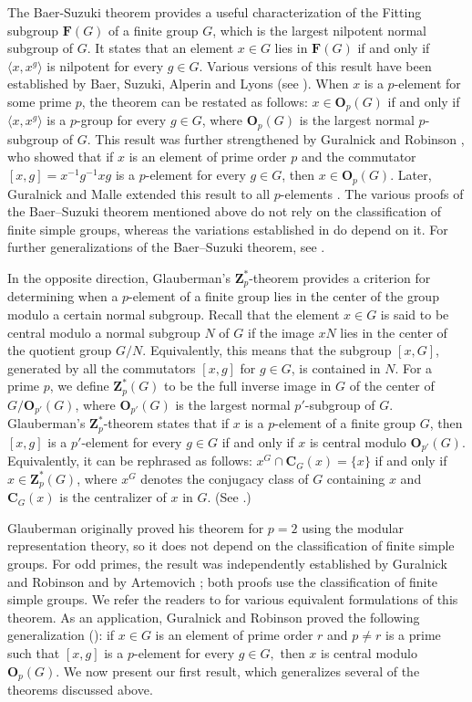 \documentclass[twoside,a4paper,reqno,12pt]{amsart}
\newcommand{\<}{\langle}
\renewcommand{\>}{\rangle}
\newcommand{\la}{\langle}
\newcommand{\ra}{\rangle}
\newcommand{\OB}{\mathbf{O}}
\newcommand{\CB}{\mathbf{C}}
\newcommand{\FB}{\mathbf{F}}
\newcommand{\ZB}{\mathbf{Z}}
\renewcommand{\:}{\colon}
\theoremstyle{definition}
\begin{document}
The Baer-Suzuki theorem provides a useful characterization of the Fitting subgroup $\FB(G)$ of a finite group $G$, which is the largest nilpotent normal subgroup of $G$. It states that an element $x\in G$ lies in $\FB(G)$ if and only if $\la x,x^g\ra$ is nilpotent for every $g\in G.$ Various versions of this result  have been established by Baer, Suzuki, Alperin and Lyons (see \cite{Baer,Suzuki,AL}).
When $x$ is a $p$-element for some prime $p$, the theorem can be restated as follows: $x\in \OB_p(G)$ if and only if $\la x,x^g\ra$ is a $p$-group for every $g\in G$, where $\OB_p(G)$ is the largest normal $p$-subgroup of $G$.  This result was further strengthened by Guralnick and Robinson \cite[Theorem A]{GR}, who showed that if $x$ is an element of prime order $p$ and the commutator $[x,g]=x^{-1}g^{-1}xg$ is a $p$-element for every $g\in G$, then $x\in \OB_p(G)$. Later, Guralnick and Malle extended this result to  all $p$-elements  \cite[Theorem 1.4]{GM1}.  The various proofs of the Baer–Suzuki theorem mentioned above do not rely on the classification of finite simple groups, whereas the variations established in \cite{GR,GM1} do depend on it. For further generalizations of the Baer–Suzuki theorem, see \cite{GTT,Wielandt}.


In the opposite direction, Glauberman's $\ZB_p^*$-theorem provides a criterion for determining when a $p$-element of a finite group lies in the center of the group modulo a certain normal subgroup. Recall that the element $x\in G$ is said to be central modulo a normal subgroup $N$ of $G$ if the image $xN$ lies in the center of the quotient group $G/N$. Equivalently, this means that  the subgroup $[x,G]$, generated by all the commutators $[x,g] $ for $g\in G$, is contained in $N$. For a prime  $p$, we define $\ZB_p^*(G)$ to be the full inverse image in $G$ of the center of $G/\OB_{p'}(G)$, where $\OB_{p'}(G)$ is the largest normal $p'$-subgroup of $G$. Glauberman's $\ZB_p^*$-theorem states that if $x$ is a $p$-element of a finite group $G$, then $[x,g]$ is a $p'$-element for every $g\in G$ if and only if $x$ is central modulo $\OB_{p'}(G)$.  Equivalently, it can be rephrased as follows:  $x^G\cap \CB_G(x)=\{x\}$ if and only if $x\in \ZB_p^*(G)$, where $x^G$ denotes the conjugacy class of $G$ containing $x$ and $\CB_G(x)$ is the centralizer of $x$ in $G$. (See \cite[Theorem 5.1]{GTT}.)


Glauberman \cite{Glauberman} originally proved his theorem for $p=2$  using the modular representation theory, so it does not depend on the classification of finite simple groups. For odd primes, the result was independently established by Guralnick and Robinson  \cite{GR} and by Artemovich \cite{Ar}; both proofs use the classification of finite simple groups.  We refer the readers to \cite{GTT} for various equivalent formulations  of this theorem. As an application, Guralnick and Robinson proved the following generalization (\cite[Theorem D(ii)]{GR}): if $x\in G$ is an element of prime order $r$ and $p\neq r$ is a prime such that $[x,g]$ is a $p$-element for every $g\in G,$ then $x$ is central modulo $\OB_p(G)$.
We now present our first result, which generalizes several of the  theorems discussed above.
\end{document}
